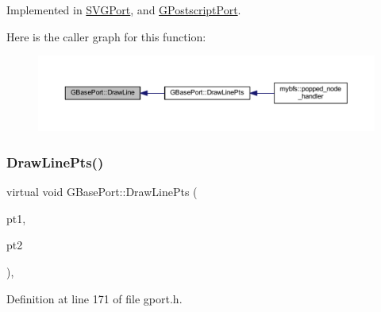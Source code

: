Implemented in \mbox{\hyperlink{class_s_v_g_port_ab51984003b6e8f6170ef3fe4ba09b030}{S\+V\+G\+Port}}, and \mbox{\hyperlink{class_g_postscript_port_a5f148a471c23fbf49397e17947c426e2}{G\+Postscript\+Port}}.

Here is the caller graph for this function\+:
\nopagebreak
\begin{figure}[H]
\begin{center}
\leavevmode
\includegraphics[width=350pt]{class_g_base_port_a9e19a5d97e629c3d19be31e1938504c1_icgraph}
\end{center}
\end{figure}
\mbox{\label{class_g_base_port_ad176b1ff88c4c0a29d51869b13a288d2}} 
\subsubsection{\texorpdfstring{Draw\+Line\+Pts()}{DrawLinePts()}}
{\footnotesize\ttfamily virtual void G\+Base\+Port\+::\+Draw\+Line\+Pts (\begin{DoxyParamCaption}\item[{const \mbox{\hyperlink{class_g_point}{G\+Point}} \&}]{pt1,  }\item[{const \mbox{\hyperlink{class_g_point}{G\+Point}} \&}]{pt2 }\end{DoxyParamCaption})\hspace{0.3cm}{\ttfamily [inline]}, {\ttfamily [virtual]}}



Definition at line 171 of file gport.\+h.


